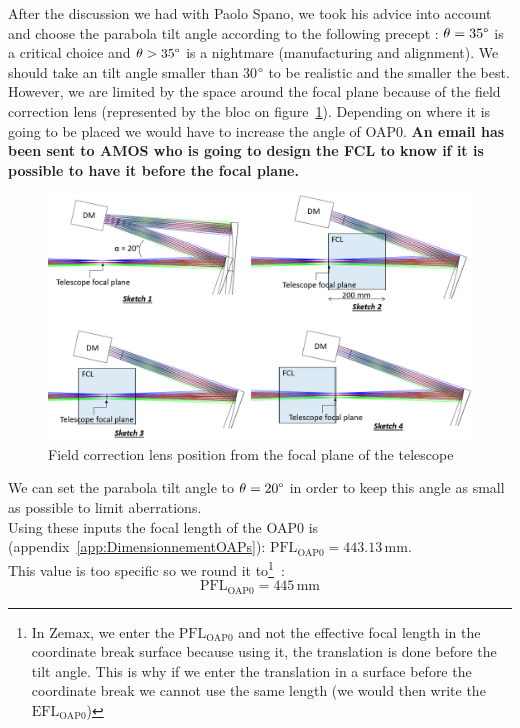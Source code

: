 \documentclass[12pt,a4paper]{article}
\begin{document}
After the discussion we had with Paolo Spano, we took his advice into account and choose the parabola tilt angle according to the following precept : $\theta= 35\degree$ is a critical choice and $\theta > 35\degree$ is a nightmare (manufacturing and alignment). We should take an tilt angle smaller than 30$\degree$ to be realistic and the smaller the best. However, we are limited by the space around the focal plane because of the field correction lens (represented by the bloc on figure~\ref{fig:FCL_space_OAP0}). Depending on where it is going to be placed we would have to increase the angle of OAP0. \textbf{An email has been sent to AMOS who is going to design the FCL to know if it is possible to have it before the focal plane.}
\begin{figure}[H]
	\begin{center}
		\includegraphics[width=.9\textwidth]{images/FCL_space_OAP0.PNG}
		\caption{Field correction lens position from the focal plane of the telescope}\label{fig:FCL_space_OAP0}
	\end{center}
\end{figure}

We  can set the parabola tilt angle to $\theta = 20\degree$ in order to keep this angle as small as possible to limit aberrations.\\

Using these inputs the focal length of the OAP0 is (appendix~\ref{app:DimensionnementOAPs}): $\text{PFL}_{\text{OAP0}} = 443.13\,\text{mm}	\nonumber$.\\
This value is too specific so we round it to\footnote{In Zemax, we enter the $\text{PFL}_{\text{OAP0}}$ and not the effective focal length in the coordinate break surface because using it, the translation is done before the tilt angle. This is why if we enter the translation in a surface before the coordinate break we cannot use the same length (we would then write the $\text{EFL}_{\text{OAP0}}$)}~:
\begin{equation}
	\text{PFL}_{\text{OAP0}} = 445\,\text{mm}	\nonumber
\end{equation}
\end{document}

